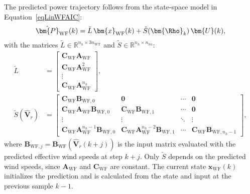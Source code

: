 The predicted power trajectory follows from the state-space model in Equation~\eqref{eqLinWFAIC}:
\begin{align*}
    \hat{\bm{P}}_{\text{WF}}(k) = \tilde{L}\, \bm{x}_{\text{WF}}(k) + \tilde{S}(\bm{\Rho}_k)\, \bm{U}(k),
\end{align*}
with the matrices $\tilde{L} \in \mathbb{R}^{n_h \times 3n_{\text{WT}}}$ and $\tilde{S} \in \mathbb{R}^{n_h \times n_{hu}}$:
\begin{equation} \label{eq:ltildeWF}
    \begin{aligned}
        \tilde{L} &=
        \begin{bmatrix}
            \bm{C}_{\text{WF}} \bm{A}_{\text{WF}} \\ \bm{C}_{\text{WF}} \bm{A}_{\text{WF}}^2 \\ \vdots \\ \bm{C}_{\text{WF}} \bm{A}_{\text{WF}}^{n_h}
        \end{bmatrix}, \\
        \tilde{S}(\hat{\bm{V}}_r) &=
        \begin{bmatrix}
            \bm{C}_{\text{WF}} \bm{B}_{\text{WF},0} & \bm{0} & \cdots & \bm{0} \\
            \bm{C}_{\text{WF}} \bm{A}_{\text{WF}} \bm{B}_{\text{WF},0} & \bm{C}_{\text{WF}} \bm{B}_{\text{WF},1} & \cdots & \bm{0} \\
            \vdots & \vdots & \ddots & \vdots \\
            \bm{C}_{\text{WF}} \bm{A}_{\text{WF}}^{n_h-1} \bm{B}_{\text{WF},0} & \bm{C}_{\text{WF}} \bm{A}_{\text{WF}}^{n_h-2} \bm{B}_{\text{WF},1} & \cdots & \bm{C}_{\text{WF}} \bm{B}_{\text{WF},n_h-1}
        \end{bmatrix},
    \end{aligned}
\end{equation}
where $\bm{B}_{\text{WF},j} = \bm{B}_{\text{WF}}(\hat{\bm{V}}_r(k+j))$ is the input matrix evaluated with the predicted effective wind speeds at step $k+j$. Only $\tilde{S}$ depends on the predicted wind speeds, since $\bm{A}_{\text{WF}}$ and $\bm{C}_{\text{WF}}$ are constant. The current state $\bm{x}_{\text{WF}}(k)$ initializes the prediction and is calculated from the state and input at the previous sample $k-1$.

